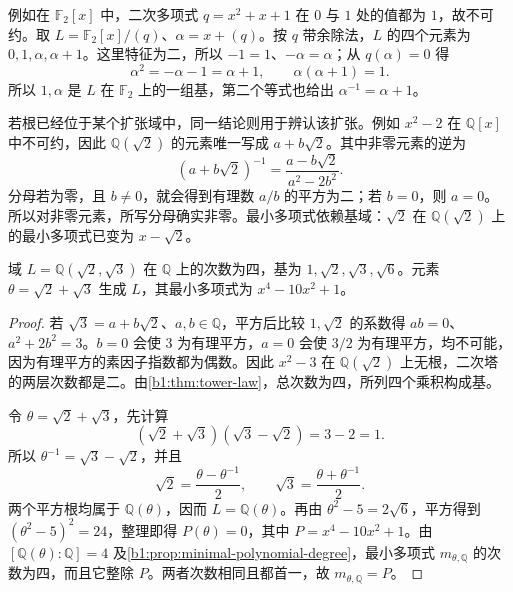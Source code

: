 \ProseParagraphBreak

例如在 \(\mathbb F_2[x]\) 中，二次多项式 \(q=x^2+x+1\) 在 \(0\) 与 \(1\) 处的值都为 \(1\)，故不可约。取 \(L=\mathbb F_2[x]/(q)\)、\(\alpha=x+(q)\)。按 \(q\) 带余除法，\(L\) 的四个元素为 \(0,1,\alpha,\alpha+1\)。这里特征为二，所以 \(-1=1\)、\(-\alpha=\alpha\)；从 \(q(\alpha)=0\) 得
\[
	\alpha^2=-\alpha-1=\alpha+1,\qquad \alpha(\alpha+1)=1.
\]
所以 \(1,\alpha\) 是 \(L\) 在 \(\mathbb F_2\) 上的一组基，第二个等式也给出 \(\alpha^{-1}=\alpha+1\)。

\ProseParagraphBreak

若根已经位于某个扩张域中，同一结论则用于辨认该扩张。例如 \(x^2-2\) 在 \(\mathbb Q[x]\) 中不可约，因此 \(\mathbb Q(\sqrt2)\) 的元素唯一写成 \(a+b\sqrt2\)。其中非零元素的逆为
\[
	(a+b\sqrt2)^{-1}=\frac{a-b\sqrt2}{a^2-2b^2}.
\]
分母若为零，且 \(b\neq0\)，就会得到有理数 \(a/b\) 的平方为二；若 \(b=0\)，则 \(a=0\)。所以对非零元素，所写分母确实非零。最小多项式依赖基域：\(\sqrt2\) 在 \(\mathbb Q(\sqrt2)\) 上的最小多项式已变为 \(x-\sqrt2\)。

\begin{proposition}\label{b1:prop:biquadratic-example}
	域 \(L=\mathbb Q(\sqrt2,\sqrt3)\) 在 \(\mathbb Q\) 上的次数为四，基为 \(1,\sqrt2,\sqrt3,\sqrt6\)。元素 \(\theta=\sqrt2+\sqrt3\) 生成 \(L\)，其最小多项式为 \(x^4-10x^2+1\)。
\end{proposition}
\begin{proof}
	若 \(\sqrt3=a+b\sqrt2\)、\(a,b\in\mathbb Q\)，平方后比较 \(1,\sqrt2\) 的系数得 \(ab=0\)、\(a^2+2b^2=3\)。\(b=0\) 会使 \(3\) 为有理平方，\(a=0\) 会使 \(3/2\) 为有理平方，均不可能，因为有理平方的素因子指数都为偶数。因此 \(x^2-3\) 在 \(\mathbb Q(\sqrt2)\) 上无根，二次塔的两层次数都是二。由\cref{b1:thm:tower-law}，总次数为四，所列四个乘积构成基。

	令 \(\theta=\sqrt2+\sqrt3\)，先计算
	\[
		(\sqrt2+\sqrt3)(\sqrt3-\sqrt2)=3-2=1.
	\]
	所以 \(\theta^{-1}=\sqrt3-\sqrt2\)，并且
	\[
		\sqrt2=\frac{\theta-\theta^{-1}}2,\qquad \sqrt3=\frac{\theta+\theta^{-1}}2.
	\]
	两个平方根均属于 \(\mathbb Q(\theta)\)，因而 \(L=\mathbb Q(\theta)\)。再由 \(\theta^2-5=2\sqrt6\)，平方得到 \((\theta^2-5)^2=24\)，整理即得 \(P(\theta)=0\)，其中 \(P=x^4-10x^2+1\)。由 \([\mathbb Q(\theta):\mathbb Q]=4\) 及\cref{b1:prop:minimal-polynomial-degree}，最小多项式 \(m_{\theta,\mathbb Q}\) 的次数为四，而且它整除 \(P\)。两者次数相同且都首一，故 \(m_{\theta,\mathbb Q}=P\)。
\end{proof}
